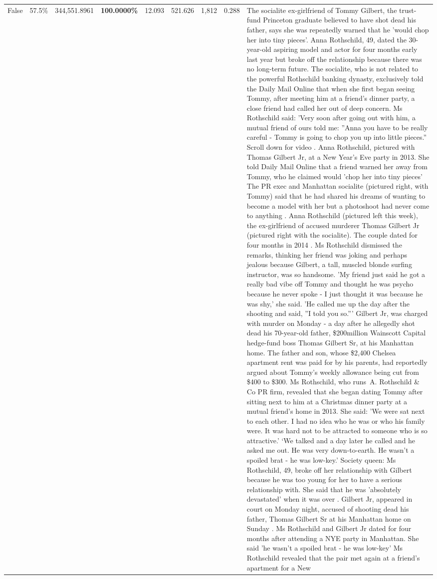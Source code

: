 \begin{table}[H]
\begin{tabular}{lllrlllll}
False & 57.5\% & 344,551.8961 & \bfseries \color{red} 100.0000\% & 12.093 & 521.626 & 1,812 & 0.288 & The socialite ex-girlfriend of Tommy Gilbert, the trust-fund Princeton graduate believed to have shot dead his father, says she was repeatedly warned that he 'would chop her into tiny pieces'. Anna Rothschild, 49, dated the 30-year-old aspiring model and actor for four months early last year but broke off the relationship because there was no long-term future. The socialite, who is not related to the powerful Rothschild banking dynasty, exclusively told the Daily Mail Online that when she first began seeing Tommy, after meeting him at a friend's dinner party, a close friend had called her out of deep concern. Ms Rothschild said: 'Very soon after going out with him, a mutual friend of ours told me: ''Anna you have to be really careful - Tommy is going to chop you up into little pieces.'' Scroll down for video . Anna Rothschild, pictured with Thomas Gilbert Jr, at a New Year's Eve party in 2013. She told Daily Mail Online that a friend warned her away from Tommy, who he claimed would 'chop her into tiny pieces' The PR exec and Manhattan socialite (pictured right, with Tommy) said that he had shared his dreams of wanting to become a model with her but a photoshoot had never come to anything . Anna Rothschild (pictured left this week), the ex-girlfriend of accused murderer Thomas Gilbert Jr (pictured right with the socialite). The couple dated for four months in 2014 . Ms Rothschild dismissed the remarks, thinking her friend was joking and perhaps jealous because Gilbert, a tall, muscled blonde surfing instructor, was so handsome. 'My friend just said he got a really bad vibe off Tommy and thought he was psycho because he never spoke - I just thought it was because he was shy,' she said. 'He called me up the day after the shooting and said, ''I told you so.''' Gilbert Jr, was charged with murder on Monday - a day after he allegedly shot dead his 70-year-old father, \$200million Wainscott Capital hedge-fund boss Thomas Gilbert Sr, at his Manhattan home. The father and son, whose \$2,400 Chelsea apartment rent was paid for by his parents, had reportedly argued about Tommy's weekly allowance being cut from \$400 to \$300. Ms Rothschild, who runs A. Rothschild \& Co PR firm, revealed that she began dating Tommy after sitting next to him at a Christmas dinner party at a mutual friend's home in 2013. She said: 'We were sat next to each other. I had no idea who he was or who his family were. It was hard not to be attracted to someone who is so attractive.' ‘We talked and a day later he called and he asked me out. He was very down-to-earth. He wasn’t a spoiled brat - he was low-key.’ Society queen: Ms Rothschild, 49, broke off her relationship with Gilbert because he was too young for her to have a serious relationship with. She said that he was 'absolutely devastated' when it was over . Gilbert Jr, appeared in court on Monday night, accused of shooting dead his father, Thomas Gilbert Sr at his Manhattan home on Sunday . Ms Rothschild and Gilbert Jr dated for four months after attending a NYE party in Manhattan. She said 'he wasn't a spoiled brat - he was low-key' Ms Rothschild revealed that the pair met again at a friend’s apartment for a New 
\end{tabular}
\end{table}
